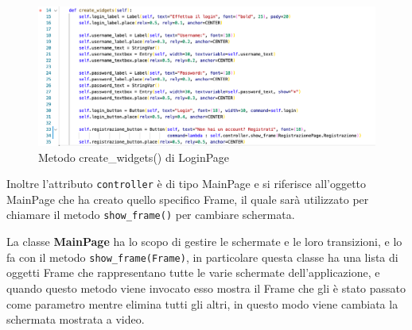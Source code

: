 \begin{figure}[!h]
\includegraphics[width=1.0\textwidth]{immagini/createwidgets.png}
\caption{Metodo create\_widgets() di LoginPage \cite{codice}}
\label{fig:createwidgets}
\end{figure}

Inoltre l'attributo \verb+controller+ è di tipo MainPage e si riferisce all'oggetto MainPage che ha creato quello specifico Frame, il quale sarà utilizzato per chiamare il metodo \verb+show_frame()+ per cambiare schermata.

La classe \textbf{MainPage} ha lo scopo di gestire le schermate e le loro transizioni, e lo fa con il metodo \verb+show_frame(Frame)+, in particolare questa classe ha una lista di oggetti Frame che rappresentano tutte le varie schermate dell'applicazione, e quando questo metodo viene invocato esso mostra il Frame che gli è stato passato come parametro mentre elimina tutti gli altri, in questo modo viene cambiata la schermata mostrata a video.

